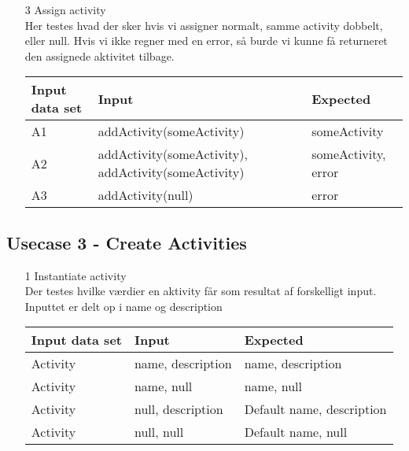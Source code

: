 \documentclass[a4paper,12pt]{article}
\begin{document}
\begin{enumerate}
\begin{center}
\begin{tabular}{|l|l|l|}
		\end{tabular}
		\end{center}
	\item[3] Assign activity\\
		Her testes hvad der sker hvis vi assigner normalt, samme activity dobbelt, eller null. Hvis vi ikke regner med en error, så burde vi kunne få returneret den assignede aktivitet tilbage.
			\begin{center}
			\begin{tabular}{|l|l|l|}
				\hline
				Input data set & Input & Expected \\
				\hline
				A1 & addActivity(someActivity) & someActivity \\
				A2 & addActivity(someActivity), addActivity(someActivity) & someActivity, error \\
				A3 & addActivity(null) & error \\
				\hline
			\end{tabular}
			\end{center}
\end{enumerate}
\subsection{Usecase 3 - Create Activities}
\begin{enumerate}
	\item[1] Instantiate activity\\
		Der testes hvilke værdier en aktivity får som resultat af forskelligt input. Inputtet er delt op i name og description
			\begin{center}
			\begin{tabular}{|l|l|l|}
				\hline
				Input data set & Input & Expected \\
				\hline
				Activity & name, description & name, description \\
				Activity & name, null & name, null \\
				Activity & null, description & Default name, description \\
				Activity & null, null & Default name, null \\
				\hline
			\end{tabular}
			\end{center}
\end{enumerate}
\end{document}
